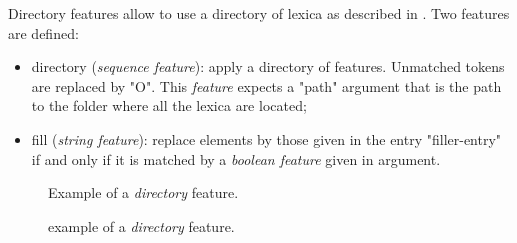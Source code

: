 \documentclass[manual-fr.tex]{subfiles}
\begin{document}
Directory features allow to use a directory of lexica as described in \cite{dupont2017exploration}. Two features are defined:
\begin{itemize}
    \item directory (\textit{sequence feature}): apply a directory of features. Unmatched tokens are replaced by "O". This \textit{feature} expects a "path" argument that is the path to the folder where all the lexica are located;
    \item fill (\textit{string feature}): replace elements by those given in the entry "filler-entry" if and only if it is matched by a \textit{boolean feature} given in argument.
\end{itemize}

\begin{figure}[ht!]
\footnotesize
\begin{xml}
\end{xml}
\caption{Example of a \textit{directory} feature.}
\label{fig:feature-directory}
\end{figure}

\begin{figure}[ht!]
\footnotesize
\begin{xml}
\end{xml}
\caption{example of a \textit{directory} feature.}
\label{fig:feature-directory-fill}
\end{figure}
\end{document}

